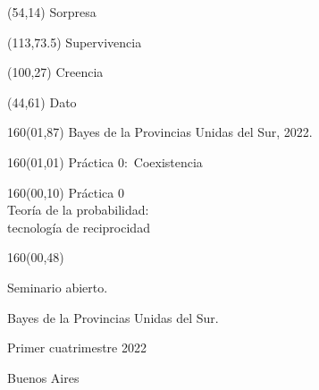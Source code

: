 \documentclass[shownotes,aspectratio=169]{beamer}
\begin{document}
\color{black!85}
\large

\begin{frame}
\begin{textblock}{80}(54,14)
 \huge \textcolor{black!50}{Sorpresa}
\end{textblock}

\begin{textblock}{47}(113,73.5)
\centering \LARGE  \textcolor{black!5}{Supervivencia}
\end{textblock}

\begin{textblock}{80}(100,27)
\LARGE  \textcolor{black!10}{Creencia}
\end{textblock}

\begin{textblock}{80}(44,61)
\LARGE  \textcolor{black!15}{Dato}
\end{textblock}

\begin{textblock}{160}(01,87)
\scriptsize \textcolor{black!5}{Bayes de la Provincias Unidas del Sur, 2022.}
\end{textblock}

\begin{textblock}{160}(01,01)
\normalsize \textcolor{black!60}{Práctica 0:\ Coexistencia}
\end{textblock}


{}
\end{frame}



\begin{frame}
\begin{textblock}{160}(00,10)
\centering
\huge Práctica 0 \\[0.4cm] 
\LARGE Teoría de la probabilidad: \\ tecnología de reciprocidad
\end{textblock}

\begin{textblock}{160}(00,48) \centering

Seminario abierto.

Bayes de la Provincias Unidas del Sur.


\vspace{1.5cm}

Primer cuatrimestre 2022

\vspace{.3cm}

Buenos Aires
\end{textblock}



\end{frame}
\end{document}
